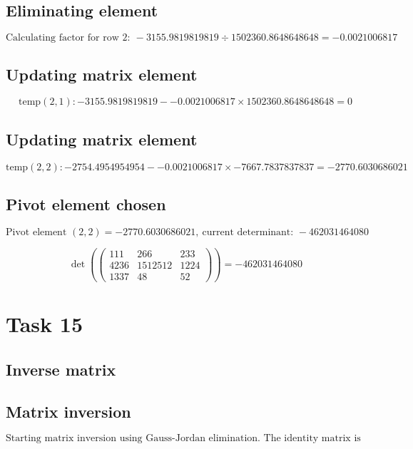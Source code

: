 \documentclass{article}
\begin{document}
\subsection*{ \vspace{1em} Eliminating element}
\[
\text{Calculating factor for row } 2:\ -3155.9819819819 \div 1502360.8648648648 = -0.0021006817
\]
\subsection*{ \vspace{1em} Updating matrix element}
\[
\text{temp}( 2,1 ): -3155.9819819819 - -0.0021006817 \times 1502360.8648648648 = 0
\]
\subsection*{ \vspace{1em} Updating matrix element}
\[
\text{temp}( 2,2 ): -2754.4954954954 - -0.0021006817 \times -7667.7837837837 = -2770.6030686021
\]
\subsection*{ \vspace{1em} Pivot element chosen}
\[
\text{Pivot element } ( 2,2 ) = -2770.6030686021,\ \text{current determinant: } -462031464080
\]
\medskip

\[
\det(\begin{pmatrix}111 & 266 & 233 \\ 4236 & 1512512 & 1224 \\ 1337 & 48 & 52\end{pmatrix}) = -462031464080
\]
\bigskip

\hrulefill
\bigskip

\section*{Task 15}

\subsection*{Inverse matrix}
\subsection*{ \vspace{1em} Matrix inversion}
\[
\text{Starting matrix inversion using Gauss-Jordan elimination. The identity matrix is augmented and operations are applied to transform the original matrix to the identity, and the identity to the inverse.}
\]
\end{document}
